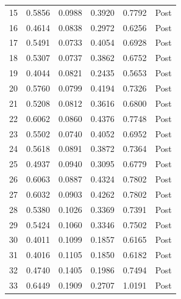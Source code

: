 \documentclass[bibtex]{article}
\begin{document}
{\begin{longtable}{cccccc}
15 & 0.5856 & 0.0988 & 0.3920 & 0.7792 & Post \\
16 & 0.4614 & 0.0838 & 0.2972 & 0.6256 & Post \\
17 & 0.5491 & 0.0733 & 0.4054 & 0.6928 & Post \\
18 & 0.5307 & 0.0737 & 0.3862 & 0.6752 & Post \\
19 & 0.4044 & 0.0821 & 0.2435 & 0.5653 & Post \\
20 & 0.5760 & 0.0799 & 0.4194 & 0.7326 & Post \\
21 & 0.5208 & 0.0812 & 0.3616 & 0.6800 & Post \\
22 & 0.6062 & 0.0860 & 0.4376 & 0.7748 & Post \\
23 & 0.5502 & 0.0740 & 0.4052 & 0.6952 & Post \\
24 & 0.5618 & 0.0891 & 0.3872 & 0.7364 & Post \\
25 & 0.4937 & 0.0940 & 0.3095 & 0.6779 & Post \\
26 & 0.6063 & 0.0887 & 0.4324 & 0.7802 & Post \\
27 & 0.6032 & 0.0903 & 0.4262 & 0.7802 & Post \\
28 & 0.5380 & 0.1026 & 0.3369 & 0.7391 & Post \\
29 & 0.5424 & 0.1060 & 0.3346 & 0.7502 & Post \\
30 & 0.4011 & 0.1099 & 0.1857 & 0.6165 & Post \\
31 & 0.4016 & 0.1105 & 0.1850 & 0.6182 & Post \\
32 & 0.4740 & 0.1405 & 0.1986 & 0.7494 & Post \\
33 & 0.6449 & 0.1909 & 0.2707 & 1.0191 & Post \\
\end{longtable}

}
\end{document}
